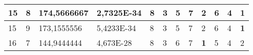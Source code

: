 \documentclass[conference]{IEEEtran}
\begin{document}
\begin{table*}[]
\begin{tabular}{|llll|llllllll|}
\multicolumn{1}{|l|}{15}                                                             & \multicolumn{1}{l|}{8}                                                                 & \multicolumn{1}{l|}{174,5666667}                                                           & 2,7325E-34                              & \multicolumn{1}{l|}{8}                                                           & \multicolumn{1}{l|}{3}                                                           & \multicolumn{1}{l|}{5}                                                           & \multicolumn{1}{l|}{7}                                                           & \multicolumn{1}{l|}{2}                                                           & \multicolumn{1}{l|}{6}                                                           & \multicolumn{1}{l|}{4}                                                           & \textbf{1}                          \\ \hline
\multicolumn{1}{|l|}{15}                                                             & \multicolumn{1}{l|}{9}                                                                 & \multicolumn{1}{l|}{173,1555556}                                                           & 5,4233E-34                              & \multicolumn{1}{l|}{8}                                                           & \multicolumn{1}{l|}{3}                                                           & \multicolumn{1}{l|}{5}                                                           & \multicolumn{1}{l|}{7}                                                           & \multicolumn{1}{l|}{2}                                                           & \multicolumn{1}{l|}{6}                                                           & \multicolumn{1}{l|}{4}                                                           & \textbf{1}                          \\ \hline
\multicolumn{1}{|l|}{16}                                                             & \multicolumn{1}{l|}{7}                                                                 & \multicolumn{1}{l|}{144,9444444}                                                           & 4,673E-28                               & \multicolumn{1}{l|}{8}                                                           & \multicolumn{1}{l|}{3}                                                           & \multicolumn{1}{l|}{6}                                                           & \multicolumn{1}{l|}{7}                                                           & \multicolumn{1}{l|}{\textbf{1}}                                                  & \multicolumn{1}{l|}{5}                                                           & \multicolumn{1}{l|}{4}                                                           & 2                                   \\ \hline

\end{tabular}
\end{table*}
\end{document}
